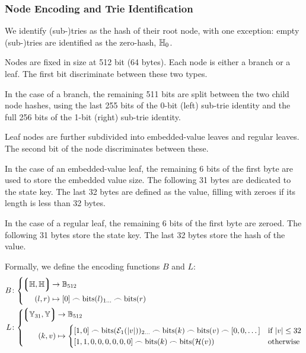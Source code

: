 \subsubsection{Node Encoding and Trie Identification}
We identify (sub-)tries as the hash of their root node, with one exception: empty (sub-)tries are identified as the zero-hash, $\mathbb{H}_0$.

Nodes are fixed in size at 512 bit (64 bytes). Each node is either a branch or a leaf. The first bit discriminate between these two types.

In the case of a branch, the remaining 511 bits are split between the two child node hashes, using the last 255 bits of the 0-bit (left) sub-trie identity and the full 256 bits of the 1-bit (right) sub-trie identity.

Leaf nodes are further subdivided into embedded-value leaves and regular leaves. The second bit of the node discriminates between these.

In the case of an embedded-value leaf, the remaining 6 bits of the first byte are used to store the embedded value size. The following 31 bytes are dedicated to the state key. The last 32 bytes are defined as the value, filling with zeroes if its length is less than 32 bytes.

In the case of a regular leaf, the remaining 6 bits of the first byte are zeroed. The following 31 bytes store the state key. The last 32 bytes store the hash of the value.

Formally, we define the encoding functions $B$ and $L$:
\begin{align}
  B&\colon\abracegroup{
    \tuple{\hash, \hash} &\to \bitstringoflen{512}\\
    (l, r) &\mapsto [0] \concat \text{bits}(l)\interval{1}{} \concat \text{bits}(r)
  }\\
  L&\colon\abracegroup{
    \tuple{\bloboflen{31}, \blob} &\to \bitstringoflen{512}\\
    (k, v) &\mapsto \begin{cases}
      [1, 0] \concat \text{bits}(\fixedencode{1}{\len{v}})\interval{2}{} \concat \text{bits}(k) \concat \text{bits}(v) \concat [0, 0, \dots] &\when \len{v} \le 32\\
      [1, 1, 0, 0, 0, 0, 0, 0] \concat \text{bits}(k) \concat \text{bits}(\blake(v)) &\otherwise
    \end{cases}
  }
\end{align}

